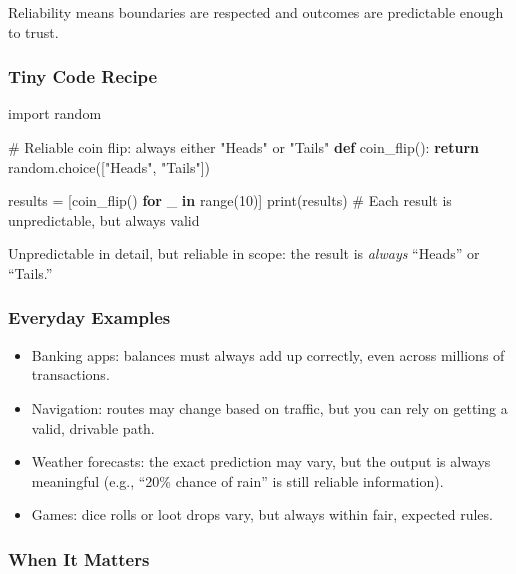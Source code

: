 \documentclass[
  letterpaper,
  DIV=11,
  numbers=noendperiod]{scrreprt}
\newenvironment{Shaded}{\begin{snugshade}}{\end{snugshade}}
\newcommand{\BuiltInTok}[1]{\textcolor[rgb]{0.00,0.23,0.31}{#1}}
\newcommand{\CommentTok}[1]{\textcolor[rgb]{0.37,0.37,0.37}{#1}}
\newcommand{\ControlFlowTok}[1]{\textcolor[rgb]{0.00,0.23,0.31}{\textbf{#1}}}
\newcommand{\DecValTok}[1]{\textcolor[rgb]{0.68,0.00,0.00}{#1}}
\newcommand{\ImportTok}[1]{\textcolor[rgb]{0.00,0.46,0.62}{#1}}
\newcommand{\KeywordTok}[1]{\textcolor[rgb]{0.00,0.23,0.31}{\textbf{#1}}}
\newcommand{\NormalTok}[1]{\textcolor[rgb]{0.00,0.23,0.31}{#1}}
\newcommand{\OperatorTok}[1]{\textcolor[rgb]{0.37,0.37,0.37}{#1}}
\newcommand{\StringTok}[1]{\textcolor[rgb]{0.13,0.47,0.30}{#1}}
\providecommand{\tightlist}{%
  \setlength{\itemsep}{0pt}\setlength{\parskip}{0pt}}
\begin{document}
Reliability means boundaries are respected and outcomes are predictable
enough to trust.

\subsubsection{Tiny Code Recipe}\label{tiny-code-recipe-25}

\begin{Shaded}
\begin{Highlighting}[]
\ImportTok{import}\NormalTok{ random}

\CommentTok{\# Reliable coin flip: always either "Heads" or "Tails"}
\KeywordTok{def}\NormalTok{ coin\_flip():}
    \ControlFlowTok{return}\NormalTok{ random.choice([}\StringTok{"Heads"}\NormalTok{, }\StringTok{"Tails"}\NormalTok{])}

\NormalTok{results }\OperatorTok{=}\NormalTok{ [coin\_flip() }\ControlFlowTok{for}\NormalTok{ \_ }\KeywordTok{in} \BuiltInTok{range}\NormalTok{(}\DecValTok{10}\NormalTok{)]}
\BuiltInTok{print}\NormalTok{(results)  }\CommentTok{\# Each result is unpredictable, but always valid}
\end{Highlighting}
\end{Shaded}

Unpredictable in detail, but reliable in scope: the result is
\emph{always} ``Heads'' or ``Tails.''

\subsubsection{Everyday Examples}\label{everyday-examples-26}

\begin{itemize}
\tightlist
\item
  Banking apps: balances must always add up correctly, even across
  millions of transactions.
\item
  Navigation: routes may change based on traffic, but you can rely on
  getting a valid, drivable path.
\item
  Weather forecasts: the exact prediction may vary, but the output is
  always meaningful (e.g., ``20\% chance of rain'' is still reliable
  information).
\item
  Games: dice rolls or loot drops vary, but always within fair, expected
  rules.
\end{itemize}

\subsubsection{When It Matters}\label{when-it-matters-25}
\end{document}
